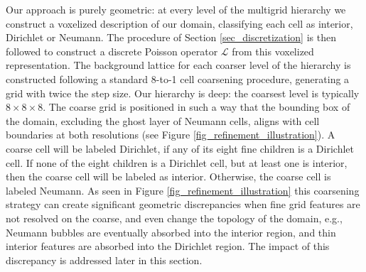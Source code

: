 Our approach is purely geometric: at every level of the multigrid hierarchy we construct a voxelized description of our domain, classifying each cell as interior, Dirichlet or
Neumann. The procedure of Section \ref{sec_discretization} is then followed to construct a discrete Poisson operator $\mathcal{L}$ from this voxelized representation. The background
lattice for each coarser level of the hierarchy is constructed following a standard 8-to-1 cell coarsening procedure, generating a grid with twice the step size. Our hierarchy is deep: the coarsest level is typically $8\times8\times8$. The coarse grid is
positioned in such a way that the bounding box of the domain, excluding the ghost layer of Neumann cells, aligns with cell boundaries at both resolutions (see Figure
\ref{fig_refinement_illustration}). A coarse cell will be labeled Dirichlet, if any of its eight fine children is a Dirichlet cell. If none of the eight children is a Dirichlet cell, but at least one is
interior, then the coarse cell will be labeled as interior. Otherwise, the coarse cell is labeled Neumann. As seen in Figure \ref{fig_refinement_illustration} this coarsening strategy
can create significant geometric discrepancies when fine grid features are not resolved on the coarse, and even change the topology of the domain, e.g., Neumann bubbles are eventually
absorbed into the interior region, and thin interior features are absorbed into the Dirichlet region. The impact of this discrepancy is addressed later in this section.

